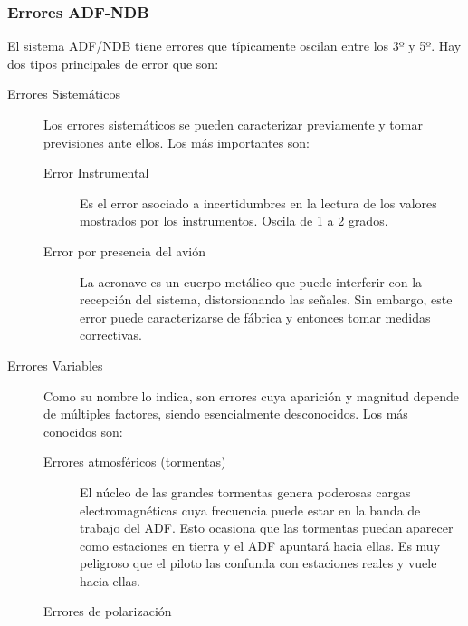 


\subsubsection{Errores ADF-NDB}

El sistema ADF/NDB tiene errores que t\'ipicamente oscilan entre los 3º y 5º. Hay dos tipos principales de error que son:

\begin{description}
\item [Errores Sistem\'aticos]

Los errores sistem\'aticos se pueden caracterizar previamente y tomar previsiones ante ellos. Los m\'as importantes son:

\begin{description}
\item [Error Instrumental]

Es el error asociado a incertidumbres en la lectura de los valores mostrados por los instrumentos. Oscila de 1 a 2 grados.

\item [Error por presencia del avi\'on]

La aeronave es un cuerpo met\'alico que puede interferir con la recepci\'on del sistema, distorsionando las se\~nales. Sin embargo, este error puede caracterizarse de f\'abrica y entonces tomar medidas correctivas.

\end{description}


\item [Errores Variables]

Como su nombre lo indica, son errores cuya aparici\'on y magnitud depende de m\'ultiples factores, siendo esencialmente desconocidos. Los m\'as conocidos son:

\begin{description}

\item [Errores atmosf\'ericos (tormentas)]

El n\'ucleo de las grandes tormentas genera poderosas cargas electromagn\'eticas cuya frecuencia puede estar en la banda de trabajo del ADF. Esto ocasiona que las tormentas puedan aparecer como estaciones en tierra y el ADF apuntar\'a hacia ellas. Es muy peligroso que el piloto las confunda con estaciones reales y vuele hacia ellas.


\item [Errores de polarizaci\'on]


\end{description}
\end{description}
